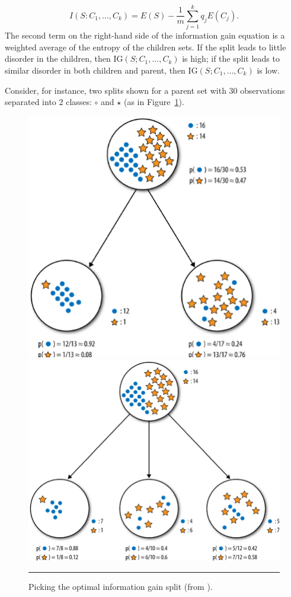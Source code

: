 $$I(S:C_1,\ldots,C_k)=E(S)-\frac{1}{m}\sum_{j=1}^kq_jE(C_j).$$
The second term on the right-hand side of the information gain equation is a weighted average of the entropy of the children sets. If the split leads to little disorder in the children, then $\textrm{IG}(S;C_1,\ldots,C_k)$ is high; if the split leads to similar disorder in both children and parent, then $\textrm{IG}(S;C_1,\ldots,C_k)$ is low.\par Consider, for instance, two splits shown for a parent set with 30 observations separated into 2 classes: $\circ$ and $\star$ (as in Figure~\ref{fig:class5}).   
\begin{figure}[!t]
\centering
\includegraphics[height=0.3\textheight]{images/DSML/parentchildren1.png}
\includegraphics[height=0.3\textheight]{images/DSML/parentchildren2.png}
\caption[\small Picking the optimal information gain split]{\small Picking the optimal information gain split (from \cite{DSML_PF}).}\hrule\label{fig:class5}
\end{figure}
